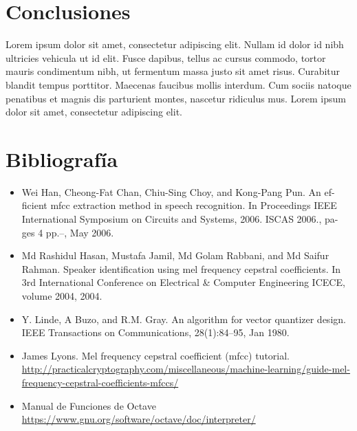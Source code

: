 \documentclass[a4paper,10pt]{article}
\begin{document}
\section{Conclusiones}
Lorem ipsum dolor sit amet, consectetur adipiscing elit. Nullam id dolor id nibh ultricies vehicula ut id elit. Fusce dapibus, tellus ac cursus commodo, tortor mauris condimentum nibh, ut fermentum massa justo sit amet risus. Curabitur blandit tempus porttitor. Maecenas faucibus mollis interdum. Cum sociis natoque penatibus et magnis dis parturient montes, nascetur ridiculus mus. Lorem ipsum dolor sit amet, consectetur adipiscing elit.

\section{Bibliografía}
\begin{itemize}

\item Wei Han, Cheong-Fat Chan, Chiu-Sing Choy, and Kong-Pang Pun. An ef- ficient mfcc extraction method in speech recognition. In Proceedings IEEE International Symposium on Circuits and Systems, 2006. ISCAS 2006., pa- ges 4 pp.–, May 2006.
\item Md Rashidul Hasan, Mustafa Jamil, Md Golam Rabbani, and Md Saifur Rahman. Speaker identification using mel frequency cepstral coefficients. In 3rd International Conference on Electrical \& Computer Engineering ICECE, volume 2004, 2004.
\item Y. Linde, A Buzo, and R.M. Gray. An algorithm for vector quantizer design. IEEE Transactions on Communications, 28(1):84–95, Jan 1980.
\item James Lyons. Mel frequency cepstral coefficient (mfcc) tutorial. 
\url{http://practicalcryptography.com/miscellaneous/machine-learning/guide-mel-frequency-cepstral-coefficients-mfccs/}
\item Manual de Funciones de Octave \url{https://www.gnu.org/software/octave/doc/interpreter/}
\end{itemize} 
\end{document}
